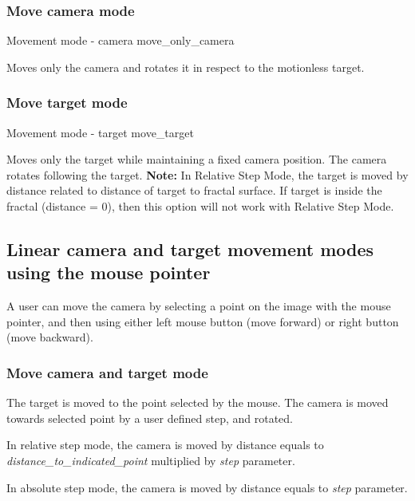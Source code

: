 \subsubsection{Move camera mode}\label{move-camera-mode}

{Movement mode - camera}
{move_only_camera}

Moves only the camera and rotates it in respect to the motionless target.

\subsubsection{Move target mode}\label{move-target-mode}

{Movement mode - target}
{move_target}

Moves only the target while maintaining a fixed camera position. The camera rotates following the target. \textbf{Note:} In Relative Step Mode, the target is moved by distance related to distance of target to fractal surface. If target is inside the fractal (distance = 0), then this option will not work with Relative Step Mode.

\subsection{Linear camera and target movement modes using the mouse
	pointer}\label{linear-camera-and-target-movement-modes-using-the-mouse-pointer}

A user can move the camera by selecting a point on the image with the mouse pointer, and then using either left mouse button (move forward) or right button (move backward).


\subsubsection{Move camera and target mode}\label{move-camera-and-target-mode-1}

The target is moved to the point selected by the mouse. The camera is moved towards selected point by a user defined step, and rotated.

In relative step mode, the camera is moved by distance equals to
\emph{distance\_to\_indicated\_point} multiplied by \emph{step} parameter.

In absolute step mode, the camera is moved by distance equals to \emph{step}
parameter.

